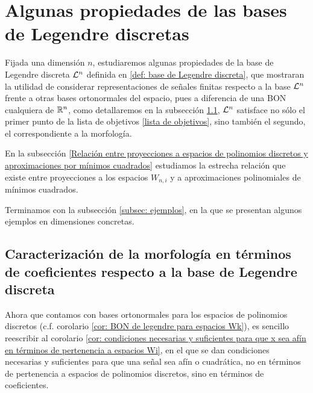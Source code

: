 \section{Algunas propiedades de las bases de Legendre discretas}

Fijada una dimensión $n$, estudiaremos algunas propiedades
de la base de Legendre discreta $\mathcal{L}^{n}$ definida en 
\ref{def: base de Legendre discreta}, que mostraran la utilidad
de considerar representaciones de señales finitas
respecto a la base
$\mathcal{L}^{n}$ frente a otras bases ortonormales del espacio, pues
a diferencia de una BON cualquiera de $\mathbb{R}^{n}$, como detallaremos
en la subsección 
\ref{Caracterización de la morfología en términos de coeficientes respecto a la base de Legendre discreta},
$\mathcal{L}^{n}$ satisface no sólo el primer punto
de la lista de objetivos
\ref{lista de objetivos}, sino también el segundo, el 
correspondiente a la morfología.

En la subsección 
\ref{Relación entre proyecciones a espacios de polinomios discretos y aproximaciones por mínimos cuadrados}
estudiamos la estrecha relación que existe entre
proyecciones a los espacios $W_{n,i}$ y a aproximaciones
polinomiales de mínimos cuadrados.

Terminamos con la subsección \ref{subsec: ejemplos},
en la que se presentan algunos ejemplos en 
dimensiones concretas.

\subsection{Caracterización de la morfología en términos de coeficientes respecto a la base de Legendre discreta}
\label{Caracterización de la morfología en términos de coeficientes respecto a la base de Legendre discreta}
Ahora que contamos con bases ortonormales
para los espacios de polinomios discretos
(c.f. corolario \ref{cor: BON de legendre para espacios Wk}),
es sencillo reescribir al corolario
\ref{cor: condiciones necesarias y suficientes para que x sea afín en términos de pertenencia a espacios Wi},
en el que se dan condiciones necesarias y suficientes para que
una señal sea afín o cuadrática,
no en términos de pertenencia a espacios de polinomios
discretos,
sino en términos de coeficientes.

